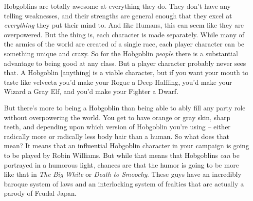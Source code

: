 
Hobgoblins are totally awesome at everything they do. They don't have any telling weaknesses, and their strengths are general enough that they excel at \textit{everything} they put their mind to. And like Humans, this can seem like they are overpowered. But the thing is, each character is made separately. While many of the armies of the world are created of a single race, each player character can be something unique and crazy. So for the Hobgoblin \textit{people} there is a substantial advantage to being good at any class. But a player character probably never sees that. A Hobgoblin [anything] is a viable character, but if you want your mouth to taste like velveeta you'd make your Rogue a Deep Halfling, you'd make your Wizard a Gray Elf, and you'd make your Fighter a Dwarf.

But there's more to being a Hobgoblin than being able to ably fill any party role without overpowering the world. You get to have orange or gray skin, sharp teeth, and depending upon which version of Hobgoblin you're using -- either radically more or radically less body hair than a human. So what does that mean? It means that an influential Hobgoblin character in your campaign is going to be played by Robin Williams. But while that means that Hobgoblins \textit{can} be portrayed in a humorous light, chances are that the humor is going to be more like that in \emph{The Big White} or \emph{Death to Smoochy}. These guys have an incredibly baroque system of laws and an interlocking system of fealties that are actually 
a parody of Feudal Japan. 
